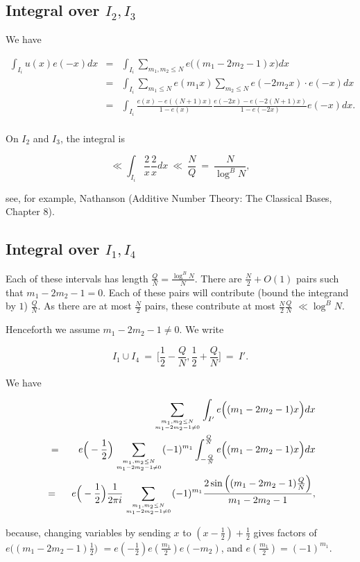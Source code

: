 \documentclass[12pt,letterpaper]{report}
\newcommand\be{\begin{equation}}
\newcommand\ee{\end{equation}}
\newcommand\bea{\begin{eqnarray}}
\newcommand\eea{\end{eqnarray}}
\newcommand{\foh}{\frac{1}{2}}  %
\begin{document}
\subsection{Integral over $I_2, I_3$}

We have

\bea \int_{I_i} u(x) e(-x)dx &=& \int_{I_i} \sum_{m_1,m_2 \le N}
e\Big( (m_1 -2m_2 - 1)x\Big)dx \nonumber\\ &=& \int_{I_i}
\sum_{m_1\le N} e(m_1x) \sum_{m_2\le N} e(-2m_2 x) \cdot e(-x)dx
\nonumber\\ &=& \int_{I_i} \frac{e(x) - e( (N+1)x)}{1 - e(x)}
\frac{e(-2x) - e(-2(N+1)x)}{1 - e(-2x)} e(-x)dx. \nonumber\\ & &
\eea

On $I_2$ and $I_3$, the integral is

\be \ll \int_{I_i} \frac{2}{x} \frac{2}{x} dx \ \ll \ \frac{N}{Q}
\ = \ \frac{N}{\log^B N}, \ee

see, for example, Nathanson (Additive Number Theory: The Classical
Bases, Chapter $8$).

\subsection{Integral over $I_1, I_4$}

Each of these intervals has length $\frac{Q}{N} = \frac{\log^B
N}{N}$. There are $\frac{N}{2} + O(1)$ pairs such that $m_1 -2m_2
- 1 = 0$. Each of these pairs will contribute (bound the integrand
by $1$) $\frac{Q}{N}$. As there are at most $\frac{N}{2}$ pairs,
these contribute at most $\frac{N}{2} \frac{Q}{N}$ $\ll \log^B N$.

Henceforth we assume $m_1 - 2m_2 - 1 \neq 0$. We write

\be I_1 \cup I_4 \ = \ \Big[ \foh - \frac{Q}{N}, \foh +
\frac{Q}{N} \Big] \ = \ I'. \ee


We have

\bea\label{eqioneifour} & & \sum_{m_1,m_2 \le N \atop m_1 - 2m_2 -
1 \neq 0} \int_{I'} e\Big( (m_1 - 2m_2 - 1)x \Big) dx\nonumber\\ &
\ = \ & e\Big(-\foh\Big) \sum_{m_1,m_2 \le N \atop m_1 - 2m_2 - 1
\neq 0} (-1)^{m_1} \int_{-\frac{Q}{N}}^{\frac{Q}{N}} e\Big( (m_1 -
2m_2 - 1)x \Big) dx \nonumber\\ &=& e\Big(-\foh\Big)\frac{1}{2\pi
i} \sum_{m_1,m_2 \le N \atop m_1 - 2m_2 - 1 \neq 0} (-1)^{m_1}
\frac{2 \sin\Big( (m_1 - 2m_2 - 1)\frac{Q}{N}\Big)}{m_1 - 2m_2 -
1}, \eea

because, changing variables by sending $x$ to $(x - \foh) + \foh$
gives factors of $e\Big( (m_1 - 2m_2 - 1)\foh\Big)$ $= e(-\foh)
e(\frac{m_1}{2}) e(-m_2)$, and $e(\frac{m_1}{2}) = (-1)^{m_1}$.
\end{document}
